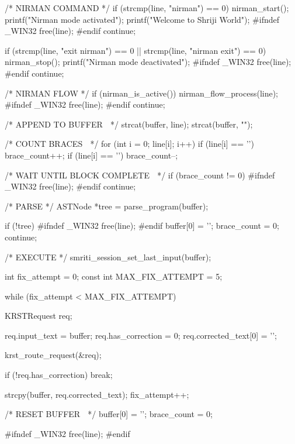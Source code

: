 \documentclass{article}
\begin{document}
{{        /* NIRMAN COMMAND */
        if (strcmp(line, "nirman") == 0)
        {
            nirman_start();
            printf("Nirman mode activated\n");
            printf("Welcome to Shriji World\n");
#ifndef _WIN32
            free(line);
#endif
            continue;
        }

        if (strcmp(line, "exit nirman") == 0 ||
            strcmp(line, "nirman exit") == 0)
        {
            nirman_stop();
            printf("Nirman mode deactivated\n");
#ifndef _WIN32
            free(line);
#endif
            continue;
        }

        /* NIRMAN FLOW */
        if (nirman_is_active())
        {
            nirman_flow_process(line);
#ifndef _WIN32
            free(line);
#endif
            continue;
        }

        /* APPEND TO BUFFER 🌸 */
        strcat(buffer, line);
        strcat(buffer, "\n");

        /* COUNT BRACES 🌸 */
        for (int i = 0; line[i]; i++)
        {
            if (line[i] == '{') brace_count++;
            if (line[i] == '}') brace_count--;
        }

        /* WAIT UNTIL BLOCK COMPLETE 🌸 */
        if (brace_count != 0)
        {
#ifndef _WIN32
            free(line);
#endif
            continue;
        }

        /* PARSE */
        ASTNode *tree = parse_program(buffer);

        if (!tree)
        {
#ifndef _WIN32
            free(line);
#endif
            buffer[0] = '\0';
            brace_count = 0;
            continue;
        }

        /* EXECUTE */
        smriti_session_set_last_input(buffer);

        int fix_attempt = 0;
        const int MAX_FIX_ATTEMPT = 5;

        while (fix_attempt < MAX_FIX_ATTEMPT)
        {
            KRSTRequest req;

            req.input_text = buffer;
            req.has_correction = 0;
            req.corrected_text[0] = '\0';

            krst_route_request(&req);

            if (!req.has_correction)
                break;

            strcpy(buffer, req.corrected_text);
            fix_attempt++;
        }

        /* RESET BUFFER 🌸 */
        buffer[0] = '\0';
        brace_count = 0;

#ifndef _WIN32
        free(line);
#endif
    }
}
\end{document}
